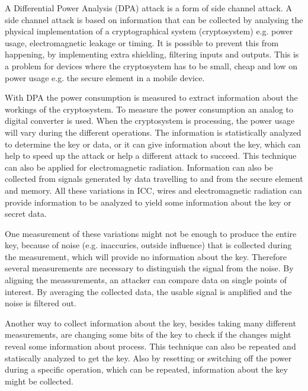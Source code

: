 A Differential Power Analysis (DPA) attack is a form of side channel attack. A side channel attack is based on information that can be collected by analysing the physical implementation of a cryptographical system (cryptosystem) e.g. power usage, electromagnetic leakage or timing. It is possible to prevent this from happening, by implementing extra shielding, filtering inputs and outputs. This is a problem for devices where the cryptosystem has to be small, cheap and low on power usage e.g. the secure element in a mobile device.

With DPA the power consumption is measured to extract information about the workings of the cryptosystem. To measure the power consumption an analog to digital converter is used. When the cryptosystem is processing, the power usage will vary during the different operations. The information is statistically analyzed to determine the key or data, or it can give information about the key, which can help to speed up the attack or help a different attack to succeed. This technique can also be applied for electromagnetic radiation. Information can also be collected from signals generated by data travelling to and from the secure element and memory.
All these variations in ICC, wires and electromagnetic radiation can provide information to be analyzed to yield some information about the key or secret data.

One measurement of these variations might not be enough to produce the entire key, because of noise (e.g. inaccuries, outside influence) that is collected during the measurement, which will provide no information about the key. Therefore several measurements are necessary to distinguish the signal from the noise. By aligning the meassurements, an attacker can compare data on single points of interest. By averaging the collected data, the usable signal is amplified and the noise is filtered out.

Another way to collect information about the key, besides taking many different measurements, are changing some bits of the key to check if the changes might reveal some information about process. This technique can also be repeated and statiscally analyzed to get the key. Also by resetting or switching off the power during a specific operation, which can be repeated, information about the key might be collected.

